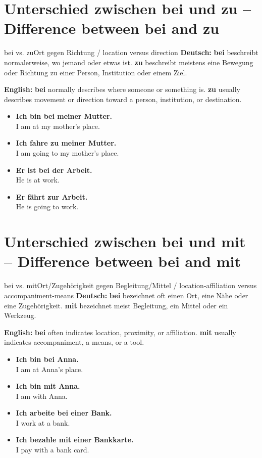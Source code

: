 \documentclass[a4paper,11pt]{article}
\newcommand{\GermanText}[1]{\textbf{Deutsch: }#1\par}
\newcommand{\EnglishText}[1]{{\small\color{SoftGray}\textbf{English: }#1\par}}
\newcommand{\ExampleItem}[2]{\item \textbf{#1}\\{\small\color{SoftGray}#2}}
\begin{document}
   \section{Unterschied zwischen bei und zu -- Difference between bei and zu}
                                 \begin{grammarentry}{bei vs. zu}{Ort gegen Richtung / location versus direction}
                                    \GermanText{\textbf{bei} beschreibt normalerweise, wo jemand oder etwas ist. \textbf{zu} beschreibt meistens eine Bewegung oder Richtung zu einer Person, Institution oder einem Ziel.}
                                    \EnglishText{\textbf{bei} normally describes where someone or something is. \textbf{zu} usually describes movement or direction toward a person, institution, or destination.}
                                 \end{grammarentry}
                                 \begin{exbox}\begin{itemize}
                                    \ExampleItem{Ich bin bei meiner Mutter.}{I am at my mother's place.}
                                    \ExampleItem{Ich fahre zu meiner Mutter.}{I am going to my mother's place.}
                                    \ExampleItem{Er ist bei der Arbeit.}{He is at work.}
                                    \ExampleItem{Er fährt zur Arbeit.}{He is going to work.}
                                    \end{itemize}\end{exbox}

   \section{Unterschied zwischen bei und mit -- Difference between bei and mit}
                                    \begin{grammarentry}{bei vs. mit}{Ort/Zugehörigkeit gegen Begleitung/Mittel / location-affiliation versus accompaniment-means}
                                       \GermanText{\textbf{bei} bezeichnet oft einen Ort, eine Nähe oder eine Zugehörigkeit. \textbf{mit} bezeichnet meist Begleitung, ein Mittel oder ein Werkzeug.}
                                       \EnglishText{\textbf{bei} often indicates location, proximity, or affiliation. \textbf{mit} usually indicates accompaniment, a means, or a tool.}
                                    \end{grammarentry}
                                    \begin{exbox}\begin{itemize}
                                       \ExampleItem{Ich bin bei Anna.}{I am at Anna's place.}
                                       \ExampleItem{Ich bin mit Anna.}{I am with Anna.}
                                       \ExampleItem{Ich arbeite bei einer Bank.}{I work at a bank.}
                                       \ExampleItem{Ich bezahle mit einer Bankkarte.}{I pay with a bank card.}
                                       \end{itemize}\end{exbox}
\end{document}
